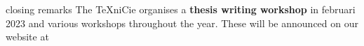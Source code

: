 \begin{frame}{closing remarks}
The \TeX niCie organises a \textbf{thesis writing workshop} in februari 2023 and various workshops throughout the year.
These will be announced on our website at
\begin{center}
\end{center}
\end{frame}